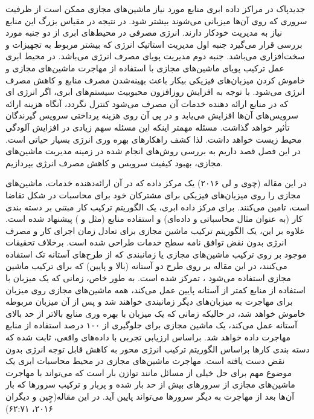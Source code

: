 ‌جدید‌پاک
  در مراکز داده ابری منابع مورد نیاز ماشین‌های مجازی ممکن است از ظرفیت سروری که روی آن‌ها میزبانی می‌شوند بیشتر شود. در نتیجه در مقیاس بزرگ این منابع نیاز به مدیریت خودکار دارند. انرژی مصرفی در محیط‌های ابری از دو جنبه مورد بررسی قرار  می‌گیرد جنبه اول مدیریت استاتیک انرژی که بیشتر مربوط به تجهیزات و سخت‌افزاری می‌باشد. جنبه دوم مدیریت پویای مصرف انرژی می‌باشد. در محیط ابری عمل  ترکیب پویای ماشین‌های مجازی با استفاده از مهاجرت ماشین‌های مجازی و خاموش ­کردن میزبان‌های فیزیکی بیکار باعث 
 بهینه‌شدن  مصرف منابع و کاهش مصرف انرژی می­‌شود­. با توجه به افزایش روزافزون محبوبیت سیستم‌های ابری، اگر انرژی ای که در منابع ارائه دهنده خدمات آن مصرف می‌شود کنترل نگردد، آنگاه هزینه ارائه سرویس‌های آن‌ها  افزایش می‌یابد و در پی آن روی هزینه پرداختی سرویس گیرندگان تأثیر خواهد گذاشت. مسئله مهمتر اینکه این مسئله سهم زیادی در افزایش آلودگی محیط زیست خواهد داشت. لذا کشف راهکارهای بهره وری انرژی بسیار حیاتی است. در این فصل قصد داریم به بررسی روش‌های انجام شده در زمینه مدیریت ماشین‌های مجازی، بهبود کیفیت سرویس و کاهش مصرف انرژی بپردازیم.
 

در این مقاله
(چوی و لی ۲۰۱۶)
یک مرکز داده که در آن ارائه‌دهنده خدمات، ماشین‌های مجازی را روی میزبان‌های فیزیکی برای مشترکان خود برای محاسبات در شکل تقاضا است، تامین می‌کنند. برای مرکز داده ابری، یک الگوریتم ترکیب کار مبتنی بر دسته بندی کار (به عنوان مثال محاسباتی و داده‌ای) و استفاده منابع (مثل 
  و
   ) پیشنهاد شده است. علاوه بر این، یک الگوریتم ترکیب ماشین مجازی برای تعادل زمان اجرای کار و مصرف انرژی بدون نقض توافق نامه سطح خدمات
     طراحی شده است. برخلاف تحقیقات موجود بر روی ترکیب ماشین‌های مجازی یا زمانبندی که از طرح‌های آستانه تک استفاده می‌کنند، در این مقاله بر روی  طرح دو آستانه (بالا و پایین) که برای ترکیب ماشین مجازی استفاده می‌شود ، تمرکز شده است. به طور خاص، زمانی که یک میزبان با استفاده از منابع کمتر از آستانه پایین عمل می‌کند، همه ماشین‌های مجازی روی میزبان برای مهاجرت به میزبان‌های دیگر زمانبندی خواهند شد و پس از آن میزبان مربوطه خاموش خواهد شد، در حالیکه زمانی که یک میزبان با بهره وری منابع بالاتر از حد بالای آستانه عمل می‌کند، یک ماشین مجازی برای جلوگیری از  ۱۰۰ درصد استفاده از منابع مهاجرت داده خواهد شد. براساس ارزیابی تجربی با داده‌های واقعی، ثابت شده که دسته بندی کارها براساس الگوریتم ترکیب انرژی محور به کاهش قابل توجه انرژی بدون نقض 
       دست یافته است.
  مهاجرت ماشین‌های مجازی در محیط محاسبات ابری یک موضوع مهم برای حل خیلی از مسائل مانند توازن بار است که می‌تواند با  مهاجرت ماشین‌های مجازی از سرورهای بیش از حد بار شده و پربار و ترکیب سرورها که بار آن‌ها بعد از مهاجرت به دیگر سرورها می‌تواند پایین آید. در این مقاله(چِین و دیگران ۲۰۱۶، ۶۲:۷۱)
  

